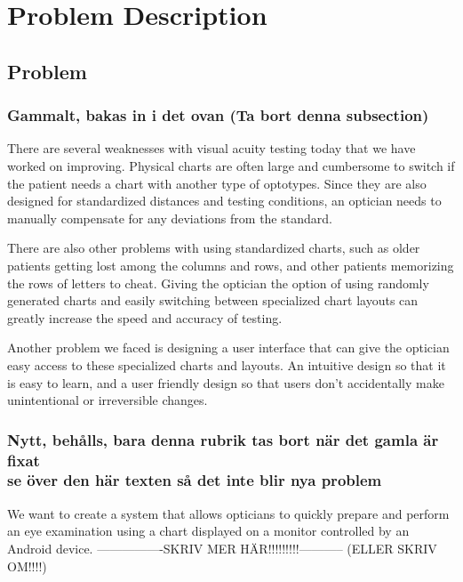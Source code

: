 \documentclass[12pt,a4paper,notitlepage]{report}
\begin{document}
\chapter{ Problem Description}
\section{Problem}
\subsection{Gammalt, bakas in i det ovan (Ta bort denna subsection)}
There are several weaknesses with visual acuity testing today that we have worked on improving. Physical charts are often large and cumbersome to switch if the patient needs a chart with another type of optotypes. Since they are also designed for standardized distances and testing conditions, an optician needs to manually compensate for any deviations from the standard. 

There are also other problems with using standardized charts, such as older patients getting lost among the columns and rows, and other patients memorizing the rows of letters to cheat. Giving the optician the option of using randomly generated charts and easily switching between specialized chart layouts can greatly increase the speed and accuracy of testing.

Another problem we faced is designing a user interface that can give the optician easy access to these specialized charts and layouts. An intuitive design so that it is easy to learn, and a user friendly design so that users don't accidentally make unintentional or irreversible changes.

\subsection{Nytt, behålls, bara denna rubrik tas bort när det gamla är fixat \\ se över den här texten så det inte blir nya problem}
We want to create a system that allows opticians to quickly prepare and perform an eye examination using a chart displayed on a monitor controlled by an Android device. 
----------------SKRIV MER HÄR!!!!!!!!!----------- (ELLER SKRIV OM!!!!)
\end{document}
